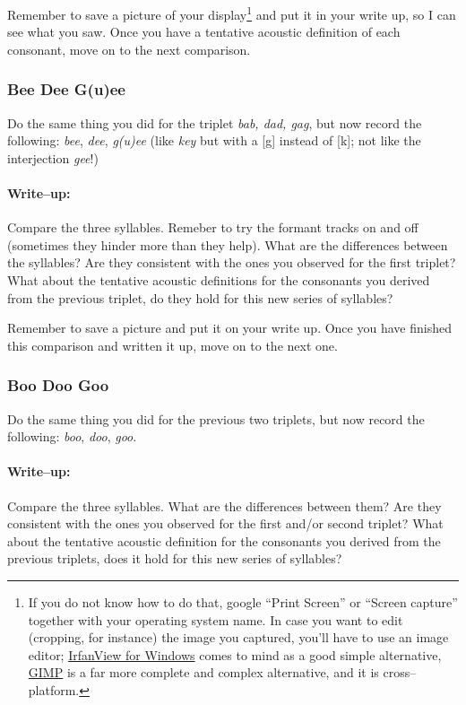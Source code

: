 Remember to save a picture of your display\footnote{If you do not know how to do that, google ``Print Screen'' or ``Screen capture'' together with your operating system name. In case you want to edit (cropping, for instance) the image you captured, you'll have to use an image editor; \href{http://www.irfanview.com/}{IrfanView for Windows} comes to mind as a good simple alternative, \href{http://www.gimp.org/}{GIMP} is a far more complete and complex alternative, and it is cross--platform.} and put it in your write up, so I can see what you saw. Once you have a tentative acoustic definition of each consonant, move on to the next comparison.

\subsubsection{Bee Dee G(u)ee}

Do the same thing you did for the triplet \emph{bab, dad, gag}, but now record the following: \emph{bee}, \emph{dee}, \emph{g(u)ee} (like \emph{key} but with a [g] instead of [k]; not like the interjection \emph{gee}!)

\paragraph{Write--up:} Compare the three syllables. Remeber to try the formant tracks on and off (sometimes they hinder more than they help). What are the differences between the syllables? Are they consistent with the ones you observed for the first triplet? What about the tentative acoustic definitions for the consonants you derived from the previous triplet, do they hold for this new series of syllables?

Remember to save a picture and put it on your write up. Once you have finished this comparison and written it up, move on to the next one.

\subsubsection{Boo Doo Goo}

Do the same thing you did for the previous two triplets, but now record the following: \emph{boo}, \emph{doo}, \emph{goo}.

\paragraph{Write--up:} Compare the three syllables. What are the differences between them? Are they consistent with the ones you observed for the first and/or second triplet? What about the tentative acoustic definition for the consonants you derived from the previous triplets, does it hold for this new series of syllables?

